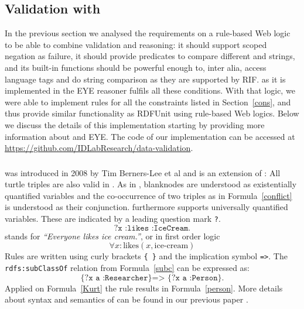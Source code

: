 \subsection{Validation with \nthreelogic}\label{n3}
In the previous section we analysed the requirements
on a rule-based Web logic to be able to combine validation and reasoning:
it should support scoped 
negation as failure, it should provide predicates to compare different \uris and strings, and its built-in functions should be powerful enough to, inter alia, 
access language tags
and do string comparison as they are supported by RIF.
\nthreelogic as it is implemented in the EYE reasoner \cite{eyepaper} fulfils all these conditions. 
With that logic, we were able to implement rules for all the constraints listed in Section~\ref{cons}, and thus 
provide similar functionality as RDFUnit using rule-based Web logics.
Below we discuss the
details of this implementation starting by providing more information about \nthreelogic and EYE. 
The code of our implementation can be accessed at \url{https://github.com/IDLabResearch/data-validation}. 



\subsubsection{\nthreelogic}\label{n3syn}
\nthreelogic was introduced in 2008 by Tim Berners-Lee et al \cite{N3Logic} and is an extension of \rdf:
All \rdf turtle triples are also valid in \nthree. 
As in \rdf, blanknodes are understood as existentially quantified variables and the co-occurrence of two triples as in Formula~\ref{conflict} 
is understood as their conjunction. \nthree furthermore supports universally quantified variables. These are indicated by a leading question mark \texttt{?}. 
\begin{equation}
 \texttt{?x :likes :IceCream.}
\end{equation}
stands for \textit{``Everyone likes ice cream.''},  or in first order logic
\[\forall x: \text{likes}(x, \text{ice-cream})\]
Rules are written using curly brackets \texttt{\{~\}} and the implication symbol \texttt{=>}. The \texttt{rdfs:subClassOf} 
relation from Formula~\ref{subc} can be expressed as:
\begin{equation}\label{rulescl}
 \texttt{\{?x a :Researcher\} => \{?x a :Person\}.}
\end{equation}
Applied on Formula~\ref{Kurt} the rule results in Formula~\ref{person}. 
More details about syntax and semantics of \nthree can be found in our previous paper \cite{arndt_ruleml_2015}.

